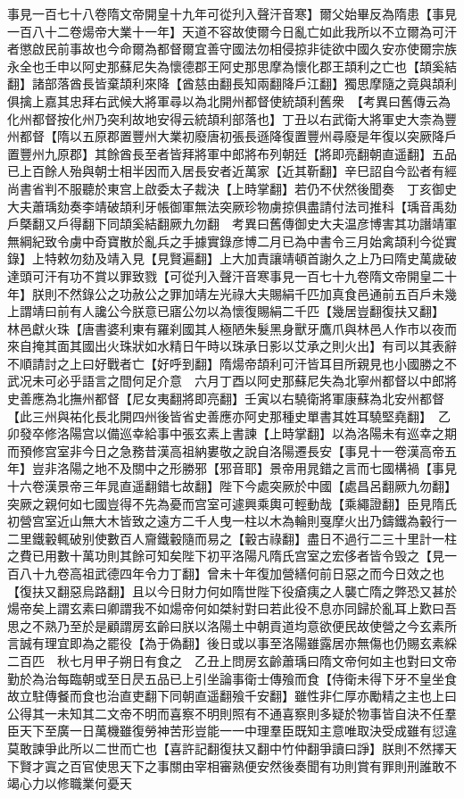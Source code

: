 事見一百七十八卷隋文帝開皇十九年可從刋入聲汗音寒】爾父始畢反為隋患【事見一百八十二卷煬帝大業十一年】天道不容故使爾今日亂亡如此我所以不立爾為可汗者懲啟民前事故也今命爾為都督爾宜善守國法勿相侵掠非徒欲中國久安亦使爾宗族永全也壬申以阿史那蘇尼失為懷德郡王阿史那思摩為懷化郡王頡利之亡也【頡奚結翻】諸部落酋長皆棄頡利來降【酋慈由翻長知兩翻降戶江翻】獨思摩隨之竟與頡利俱擒上嘉其忠拜右武候大將軍尋以為北開州都督使統頡利舊衆　【考異曰舊傳云為化州都督按化州乃突利故地安得云統頡利部落也】丁丑以右武衛大將軍史大柰為豐州都督【隋以五原郡置豐州大業初廢唐初張長遜降復置豐州尋廢是年復以突厥降戶置豐州九原郡】其餘酋長至者皆拜將軍中郎將布列朝廷【將即亮翻朝直遥翻】五品已上百餘人殆與朝士相半因而入居長安者近萬家【近其靳翻】辛巳詔自今訟者有經尚書省判不服聽於東宫上啟委太子裁決【上時掌翻】若仍不伏然後聞奏　丁亥御史大夫蕭瑀劾奏李靖破頡利牙帳御軍無法突厥珍物虜掠俱盡請付法司推科【瑀音禹劾戶槩翻又戶得翻下同頡奚結翻厥九勿翻　考異曰舊傳御史大夫温彦博害其功譖靖軍無綱紀致令虜中奇寶散於亂兵之手據實錄彦博二月已為中書令三月始禽頡利今從實錄】上特敕勿劾及靖入見【見賢遍翻】上大加責讓靖頓首謝久之上乃曰隋史萬歲破達頭可汗有功不賞以罪致戮【可從刋入聲汗音寒事見一百七十九卷隋文帝開皇二十年】朕則不然錄公之功赦公之罪加靖左光祿大夫賜絹千匹加真食邑通前五百戶未幾上謂靖曰前有人讒公今朕意已寤公勿以為懷復賜絹二千匹【幾居豈翻復扶又翻】　林邑獻火珠【唐書婆利東有羅刹國其人極陋朱髮黑身獸牙鷹爪與林邑人作市以夜而來自掩其面其國出火珠狀如水精日午時以珠承日影以艾承之則火出】有司以其表辭不順請討之上曰好戰者亡【好呼到翻】隋煬帝頡利可汗皆耳目所親見也小國勝之不武况未可必乎語言之間何足介意　六月丁酉以阿史那蘇尼失為北寧州都督以中郎將史善應為北撫州都督【尼女夷翻將即亮翻】壬寅以右驍衛將軍康蘇為北安州都督【此三州與祐化長北開四州後皆省史善應亦阿史那種史單書其姓耳驍堅堯翻】　乙卯發卒修洛陽宫以備巡幸給事中張玄素上書諫【上時掌翻】以為洛陽未有巡幸之期而預修宫室非今日之急務昔漢高祖納婁敬之說自洛陽遷長安【事見十一卷漢高帝五年】豈非洛陽之地不及關中之形勝邪【邪音耶】景帝用晁錯之言而七國構禍【事見十六卷漢景帝三年晁直遥翻錯七故翻】陛下今處突厥於中國【處昌呂翻厥九勿翻】突厥之親何如七國豈得不先為憂而宫室可遽興乘輿可輕動哉【乘繩證翻】臣見隋氏初營宫室近山無大木皆致之遠方二千人曳一柱以木為輪則戛摩火出乃鑄鐵為轂行一二里鐵轂輒破别使數百人齎鐵轂隨而易之【轂古祿翻】盡日不過行二三十里計一柱之費已用數十萬功則其餘可知矣陛下初平洛陽凡隋氏宫室之宏侈者皆令毁之【見一百八十九卷高祖武德四年令力丁翻】曾未十年復加營繕何前日惡之而今日效之也【復扶又翻惡烏路翻】且以今日財力何如隋世陛下役瘡痍之人襲亡隋之弊恐又甚於煬帝矣上謂玄素曰卿謂我不如煬帝何如桀紂對曰若此役不息亦同歸於亂耳上歎曰吾思之不熟乃至於是顧謂房玄齡曰朕以洛陽土中朝貢道均意欲便民故使營之今玄素所言誠有理宜即為之罷役【為于偽翻】後日或以事至洛陽雖露居亦無傷也仍賜玄素綵二百匹　秋七月甲子朔日有食之　乙丑上問房玄齡蕭瑀曰隋文帝何如主也對曰文帝勤於為治每臨朝或至日昃五品已上引坐論事衛士傳飱而食【侍衛未得下牙不皇坐食故立駐傳餐而食也治直吏翻下同朝直遥翻飱千安翻】雖性非仁厚亦勵精之主也上曰公得其一未知其二文帝不明而喜察不明則照有不通喜察則多疑於物事皆自決不任羣臣天下至廣一日萬機雖復勞神苦形豈能一一中理羣臣既知主意唯取決受成雖有愆違莫敢諫爭此所以二世而亡也【喜許記翻復扶又翻中竹仲翻爭讀曰諍】朕則不然擇天下賢才寘之百官使思天下之事關由宰相審熟便安然後奏聞有功則賞有罪則刑誰敢不竭心力以修職業何憂天